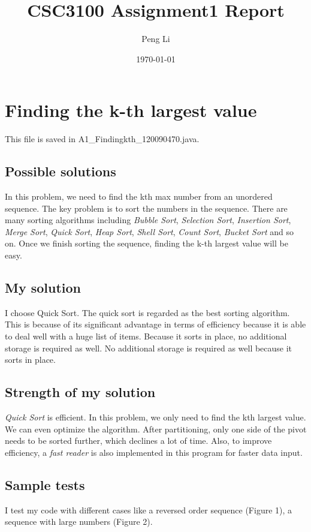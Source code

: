 \documentclass{article}
\title{\textbf{CSC3100 Assignment1 Report}}
\author{Peng Li}
\date{\today}
\begin{document}
\maketitle

\section{Finding the k-th largest value}
    \noindent This file is saved in A1\_Findingkth\_120090470.java. 

    \subsection{Possible solutions}
    In this problem, we need to find the kth max number from an unordered sequence. The key problem is to sort the numbers in the sequence. There are many sorting algorithms including \textit{Bubble Sort}, \textit{Selection Sort}, \textit{Insertion Sort}, \textit{Merge Sort}, \textit{Quick Sort}, \textit{Heap Sort}, \textit{Shell Sort}, \textit{Count Sort}, \textit{Bucket Sort} and so on. Once we finish sorting the sequence, finding the k-th largest value will be easy. 

    \subsection{My solution}
    I choose Quick Sort. The quick sort is regarded as the best sorting algorithm. This is because of its significant advantage in terms of efficiency because it is able to deal well with a huge list of items. Because it sorts in place, no additional storage is required as well. No additional storage is required as well because it sorts in place.

    \subsection{Strength of my solution}
    \textit{Quick Sort} is efficient. In this problem, we only need to find the kth largest value. We can even optimize the algorithm. After partitioning, only one side of the pivot needs to be sorted further, which declines a lot of time. Also, to improve efficiency, a \textit{fast reader} is also implemented in this program for faster data input.

    \subsection{Sample tests}
    I test my code with different cases like a reversed order sequence (Figure 1), a sequence with large numbers (Figure 2).
\end{document}
